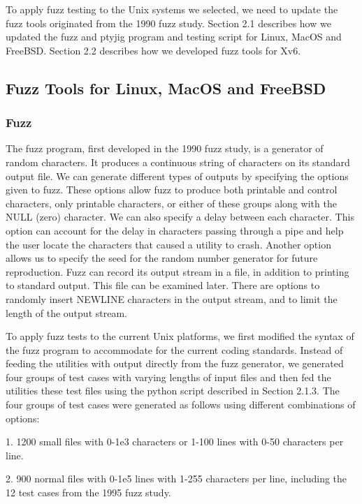 To apply fuzz testing to the Unix systems we selected, we need to update the fuzz tools originated from the 1990 fuzz study. Section 2.1 describes how we updated the fuzz and ptyjig program and testing script for Linux, MacOS and FreeBSD. Section 2.2 describes how we developed fuzz tools for Xv6. 

\subsection{Fuzz Tools for Linux, MacOS and FreeBSD}

\subsubsection{Fuzz}
The fuzz program, first developed in the 1990 fuzz study, is a generator of random characters. It produces a continuous string of characters on its standard output file. We can generate different types of outputs by specifying the options given to fuzz. These options allow fuzz to produce both printable and control characters, only printable characters, or either of these groups along with the NULL (zero) character. We can also specify a delay between each character. This option can account for the delay in characters passing through a pipe and help the user locate the characters that caused a utility to crash. Another option allows us to specify the seed for the random number generator for future reproduction. Fuzz can record its output stream in a file, in addition to printing to standard output. This file can be examined later. There are options to randomly insert NEWLINE characters in the output stream, and to limit the length of the output stream. 

To apply fuzz tests to the current Unix platforms, we first modified the syntax of the fuzz program to accommodate for the current coding standards. Instead of feeding the utilities with output directly from the fuzz generator, we generated four groups of test cases with varying lengths of input files and then fed the utilities these test files using the python script described in Section 2.1.3. The four groups of test cases were generated as follows using different combinations of options: 

1. 1200 small files with 0-1e3 characters or 1-100 lines with 0-50 characters per line.

2. 900 normal files with 0-1e5 lines with 1-255 characters per line, including the 12 test cases from the 1995 fuzz study.

